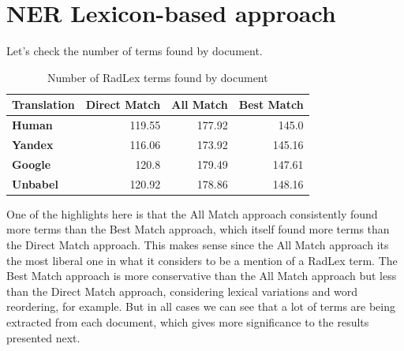 \label{chap4}





\section{NER Lexicon-based approach}

Let's check the number of terms found by document.

\begin{table}[ht]
    \centering
    \begin{tabular}{lrrr}
    \toprule
    \textbf{Translation}   &   \textbf{Direct Match} &   \textbf{All Match} &   \textbf{Best Match} \\
    \midrule
     \textbf{Human}         &         119.55 &      177.92 &       145.0 \\

     \textbf{Yandex}        &         116.06 &      173.92 &       145.16 \\

     \textbf{Google}        &         120.8 &      179.49 &       147.61 \\

     \textbf{Unbabel}       &         120.92 &      178.86 &       148.16 \\

    \bottomrule
    \end{tabular} 
    \caption{Number of RadLex terms found by document}
    \label{table:terms_by_document}
\end{table}

One of the highlights here is that the All Match approach consistently found more terms than the Best Match approach, which itself found more terms than the Direct Match approach. This makes sense since the All Match approach its the most liberal one in what it considers to be a mention of a RadLex term. The Best Match approach is more conservative than the All Match approach but less than the Direct Match approach, considering lexical variations and word reordering, for example. But in all cases we can see that a lot of terms are being extracted from each document, which gives more significance to the results presented next. 


